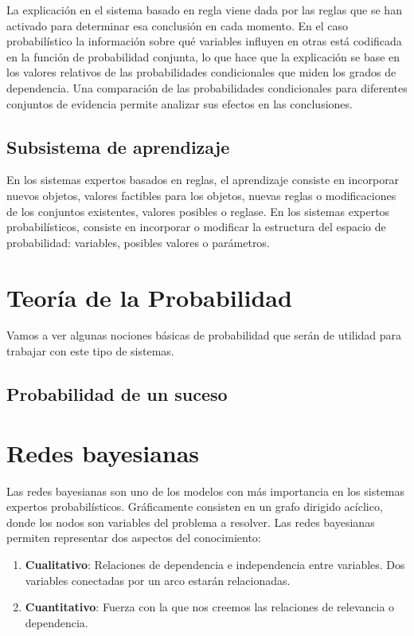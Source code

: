 \documentclass{article}
\begin{document}
La explicación en el sistema basado en regla viene dada por las reglas que se han activado para determinar esa conclusión en cada momento. En el caso probabilístico la información sobre qué variables influyen en otras está codificada en la función de probabilidad conjunta, lo que hace que la explicación se base en los valores relativos de las probabilidades condicionales que miden los grados de dependencia. Una comparación de las probabilidades condicionales para diferentes conjuntos de evidencia permite analizar sus efectos en las conclusiones.

\subsection{Subsistema de aprendizaje}

En los sistemas expertos basados en reglas, el aprendizaje consiste en incorporar nuevos objetos, valores factibles para los objetos, nuevas reglas o modificaciones de los conjuntos existentes, valores posibles o reglase. En los sistemas expertos probabilísticos, consiste en incorporar o modificar la estructura del espacio de probabilidad: variables, posibles valores o parámetros.

\section{Teoría de la Probabilidad}
Vamos a ver algunas nociones básicas de probabilidad que serán de utilidad para trabajar con este tipo de sistemas.

\subsection{Probabilidad de un suceso}



\section{Redes bayesianas}

Las redes bayesianas son uno de los modelos con más importancia en los sistemas expertos probabilísticos. Gráficamente consisten en un grafo dirigido acíclico, donde los nodos son variables del problema a resolver. Las redes bayesianas permiten representar dos aspectos del conocimiento:

\begin{enumerate}
\item \textbf{Cualitativo}: Relaciones de dependencia e independencia entre variables. Dos variables conectadas por un arco estarán relacionadas.
\item \textbf{Cuantitativo}: Fuerza con la que nos creemos las relaciones de relevancia o dependencia.
\end{enumerate} 
\end{document}
